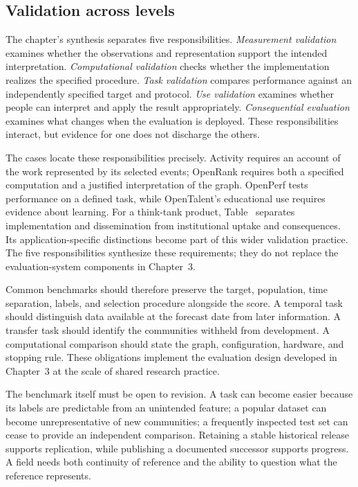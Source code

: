 \subsection{Validation across levels}
The chapter's synthesis separates five responsibilities. \emph{Measurement validation} examines whether the observations and representation support the intended interpretation. \emph{Computational validation} checks whether the implementation realizes the specified procedure. \emph{Task validation} compares performance against an independently specified target and protocol. \emph{Use validation} examines whether people can interpret and apply the result appropriately. \emph{Consequential evaluation} examines what changes when the evaluation is deployed. These responsibilities interact, but evidence for one does not discharge the others.

The cases locate these responsibilities precisely. Activity requires an account of the work represented by its selected events; OpenRank requires both a specified computation and a justified interpretation of the graph. OpenPerf tests performance on a defined task, while OpenTalent's educational use requires evidence about learning. For a think-tank product, Table~ separates implementation and dissemination from institutional uptake and consequences. Its application-specific distinctions become part of this wider validation practice. The five responsibilities synthesize these requirements; they do not replace the evaluation-system components in Chapter~3.

Common benchmarks should therefore preserve the target, population, time separation, labels, and selection procedure alongside the score. A temporal task should distinguish data available at the forecast date from later information. A transfer task should identify the communities withheld from development. A computational comparison should state the graph, configuration, hardware, and stopping rule. These obligations implement the evaluation design developed in Chapter~3 at the scale of shared research practice.

The benchmark itself must be open to revision. A task can become easier because its labels are predictable from an unintended feature; a popular dataset can become unrepresentative of new communities; a frequently inspected test set can cease to provide an independent comparison. Retaining a stable historical release supports replication, while publishing a documented successor supports progress. A field needs both continuity of reference and the ability to question what the reference represents.


